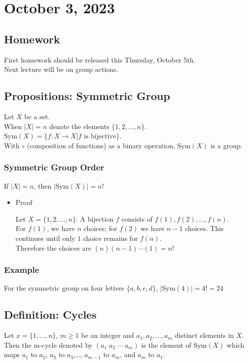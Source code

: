 \documentclass[11pt]{article}
\newcommand{\0}{\emptyset}
\begin{document}
\section*{October 3, 2023}
\label{sec:org912a97d}
\subsection*{Homework}
\label{sec:orge5e342a}
First homework should be released this Thursday, October 5th.\\[0pt]
Next lecture will be on group actions.\\[0pt]
\subsection*{Propositions: Symmetric Group}
\label{sec:org25750fe}
Let \(X\) be a set.\\[0pt]
When \(|X|=n\) denote the elements \(\{1,2,\ldots,n\}\).\\[0pt]
\(\text{Sym}(X)=\{f:X\to X|f\text{ is bijective}\}\).\\[0pt]
With \(\circ\) (composition of functions) as a binary operation, \(\text{Sym}(X)\) is a group.\\[0pt]
\subsubsection*{Symmetric Group Order}
\label{sec:orgce03f94}
If \(|X|=n\), then \(|\text{Sym}(X)|=n!\)\\[0pt]
\begin{itemize}
\item Proof
\label{sec:orgb9b5e81}

Let \(X=\{1,2,\ldots,n\}\). A bijection \(f\) consists of \(f(1),f(2),\ldots,f(n)\).\\[0pt]
For \(f(1)\), we have \(n\) choices; for \(f(2)\) we have \(n-1\) choices. This continues until only \(1\) choice remains for \(f(n)\).\\[0pt]
Therefore the choices are \((n)(n-1)\cdots(1)=n!\)\\[0pt]
\end{itemize}
\subsubsection*{Example}
\label{sec:org97deb82}
For the symmetric group on four letters \(\{a,b,c,d\}\), \(|\text{Sym}(4)|=4!=24\)\\[0pt]
\subsection*{Definition: Cycles}
\label{sec:orgdecd2a1}
Let \(x=\{1,\ldots,n\}\), \(m\geq1\) be an integer and \(a_{1},a_{2},\ldots,a_{m}\) distinct elements in \(X\).\\[0pt]
Then the m-cycle denoted by \((a_{1}\;a_{2}\;\cdots\;a_{m})\) is the element of \(\text{Sym}(X)\) which maps \(a_{1}\) to \(a_{2}\), \(a_{2}\) to \(a_{3}\),\ldots{}, \(a_{m-1}\) to \(a_{m}\), and \(a_{m}\) to \(a_{1}\).\\[0pt]
\end{document}

